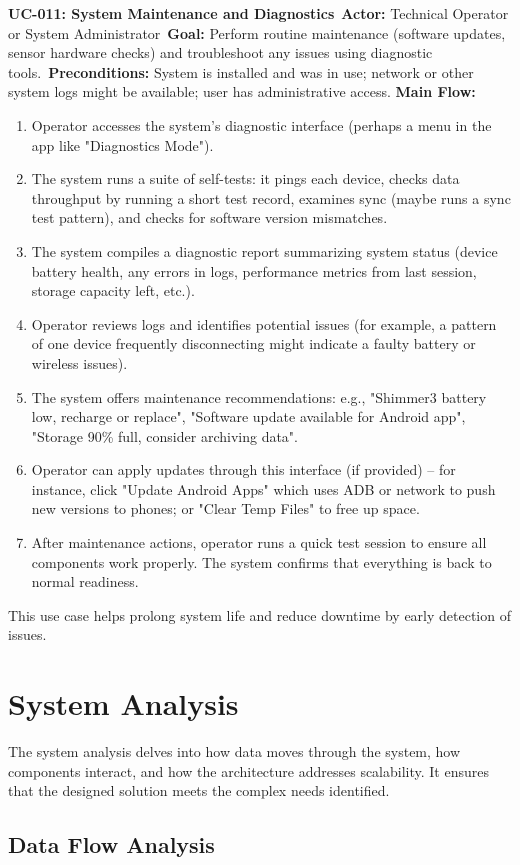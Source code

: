 \documentclass[11pt,a4paper]{report}
\begin{document}
\vspace{1ex}
\noindent\textbf{UC-011: System Maintenance and Diagnostics}\
\textbf{Actor:} Technical Operator or System Administrator\
\textbf{Goal:} Perform routine maintenance (software updates, sensor hardware checks) and troubleshoot any issues using diagnostic tools.\
\textbf{Preconditions:} System is installed and was in use; network or other system logs might be available; user has administrative access. \textbf{Main Flow:}
\begin{enumerate}
\item Operator accesses the system's diagnostic interface (perhaps a menu in the app like "Diagnostics Mode").
\item The system runs a suite of self-tests: it pings each device, checks data throughput by running a short test record, examines sync (maybe runs a sync test pattern), and checks for software version mismatches.
\item The system compiles a diagnostic report summarizing system status (device battery health, any errors in logs, performance metrics from last session, storage capacity left, etc.).
\item Operator reviews logs and identifies potential issues (for example, a pattern of one device frequently disconnecting might indicate a faulty battery or wireless issues).
\item The system offers maintenance recommendations: e.g., "Shimmer3 battery low, recharge or replace", "Software update available for Android app", "Storage 90\% full, consider archiving data".
\item Operator can apply updates through this interface (if provided) – for instance, click "Update Android Apps" which uses ADB or network to push new versions to phones; or "Clear Temp Files" to free up space.
\item After maintenance actions, operator runs a quick test session to ensure all components work properly. The system confirms that everything is back to normal readiness.
\end{enumerate} This use case helps prolong system life and reduce downtime by early detection of issues. \section{System Analysis}
The system analysis delves into how data moves through the system, how components interact, and how the architecture addresses scalability. It ensures that the designed solution meets the complex needs identified. \subsection{Data Flow Analysis}
\end{document}
